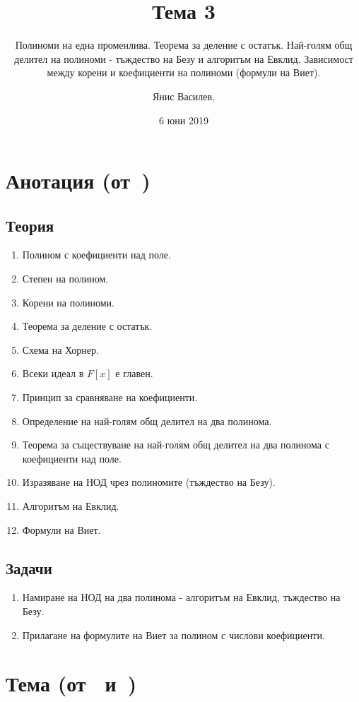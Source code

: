 \documentclass[numbers=endperiod, DIV=15]{scrartcl}
\title{Тема 3}
\subtitle{Полиноми на една променлива. Теорема за деление с остатък. Най-голям общ делител на полиноми - тъждество на Безу и алгоритъм на Евклид. Зависимост между корени и коефициенти на полиноми (формули на Виет).}
\author{Янис Василев, \Email{ianis@ivasilev.net}}
\date{6 юни 2019}
\begin{document}
\maketitle

\section{Анотация (от~\cite{Syllabus})}

\subsection{Теория}

\begin{enumerate}
  \item Полином с коефициенти над поле.
  \item Степен на полином.
  \item Корени на полиноми.
  \item Теорема за деление с остатък.
  \item Схема на Хорнер.
  \item Всеки идеал в $F[x]$ е главен.
  \item Принцип за сравняване на коефициенти.
  \item Определение на най-голям общ делител на два полинома.
  \item Теорема за съществуване на най-голям общ делител на два полинома с коефициенти над поле.
  \item Изразяване на НОД чрез полиномите (тъждество на Безу).
  \item Алгоритъм на Евклид.
  \item Формули на Виет.
\end{enumerate}

\subsection{Задачи}

\begin{enumerate}
  \item Намиране на НОД на два полинома - алгоритъм на Евклид, тъждество на Безу.
  \item Прилагане на формулите на Виет за полином с числови коефициенти.
\end{enumerate}

\section{Тема (от~\cite{Notes} и~\cite{Knapp})}
\end{document}
